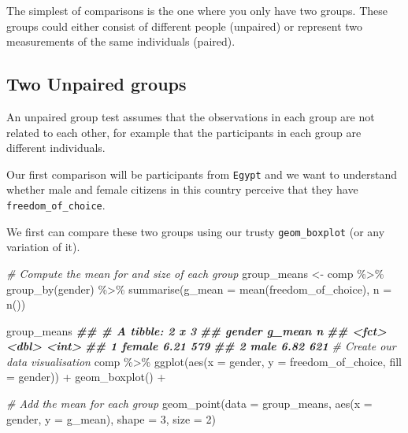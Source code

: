 \documentclass[
]{book}
\newenvironment{Shaded}{\begin{snugshade}}{\end{snugshade}}
\newcommand{\AttributeTok}[1]{\textcolor[rgb]{0.77,0.63,0.00}{#1}}
\newcommand{\CommentTok}[1]{\textcolor[rgb]{0.56,0.35,0.01}{\textit{#1}}}
\newcommand{\DecValTok}[1]{\textcolor[rgb]{0.00,0.00,0.81}{#1}}
\newcommand{\DocumentationTok}[1]{\textcolor[rgb]{0.56,0.35,0.01}{\textbf{\textit{#1}}}}
\newcommand{\FunctionTok}[1]{\textcolor[rgb]{0.00,0.00,0.00}{#1}}
\newcommand{\NormalTok}[1]{#1}
\newcommand{\OtherTok}[1]{\textcolor[rgb]{0.56,0.35,0.01}{#1}}
\newcommand{\SpecialCharTok}[1]{\textcolor[rgb]{0.00,0.00,0.00}{#1}}
\begin{document}
The simplest of comparisons is the one where you only have two groups. These groups could either consist of different people (unpaired) or represent two measurements of the same individuals (paired).

\hypertarget{two-unpaired-groups}{%
\subsection{Two Unpaired groups}\label{two-unpaired-groups}}

An unpaired group test assumes that the observations in each group are not related to each other, for example that the participants in each group are different individuals.

Our first comparison will be participants from \texttt{Egypt} and we want to understand whether male and female citizens in this country perceive that they have \texttt{freedom\_of\_choice}.

We first can compare these two groups using our trusty \texttt{geom\_boxplot} (or any variation of it).

\begin{Shaded}
\begin{Highlighting}[]
\CommentTok{\# Compute the mean for and size of each group }
\NormalTok{group\_means }\OtherTok{\textless{}{-}}\NormalTok{ comp }\SpecialCharTok{\%\textgreater{}\%} 
  \FunctionTok{group\_by}\NormalTok{(gender) }\SpecialCharTok{\%\textgreater{}\%} 
  \FunctionTok{summarise}\NormalTok{(}\AttributeTok{g\_mean =} \FunctionTok{mean}\NormalTok{(freedom\_of\_choice),}
            \AttributeTok{n =} \FunctionTok{n}\NormalTok{())}

\NormalTok{group\_means}
\DocumentationTok{\#\# \# A tibble: 2 x 3}
\DocumentationTok{\#\#   gender g\_mean     n}
\DocumentationTok{\#\#   \textless{}fct\textgreater{}   \textless{}dbl\textgreater{} \textless{}int\textgreater{}}
\DocumentationTok{\#\# 1 female   6.21   579}
\DocumentationTok{\#\# 2 male     6.82   621}
\CommentTok{\# Create our data visualisation}
\NormalTok{comp }\SpecialCharTok{\%\textgreater{}\%} 
  \FunctionTok{ggplot}\NormalTok{(}\FunctionTok{aes}\NormalTok{(}\AttributeTok{x =}\NormalTok{ gender, }\AttributeTok{y =}\NormalTok{ freedom\_of\_choice, }\AttributeTok{fill =}\NormalTok{ gender)) }\SpecialCharTok{+}
  \FunctionTok{geom\_boxplot}\NormalTok{() }\SpecialCharTok{+}
  
  \CommentTok{\# Add the mean for each group}
  \FunctionTok{geom\_point}\NormalTok{(}\AttributeTok{data =}\NormalTok{ group\_means,}
             \FunctionTok{aes}\NormalTok{(}\AttributeTok{x =}\NormalTok{ gender, }\AttributeTok{y =}\NormalTok{ g\_mean),}
             \AttributeTok{shape =} \DecValTok{3}\NormalTok{,}
             \AttributeTok{size =} \DecValTok{2}\NormalTok{)}
\end{Highlighting}
\end{Shaded}
\end{document}
